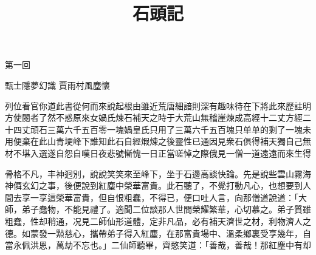 \documentclass[红楼梦甲戌本]{ltc-guji}
\title{石頭記}
\begin{document}
\begin{正文}
第一回

\begin{段落}[indent=2]
甄士隱夢幻識 賈雨村風塵懷
\end{段落}


列位看官你道此書從何而來說起根由雖近荒唐細諳則深有趣味待在下將此來歷註明方使閱者了然不惑原來女媧氏煉石補天之時于大荒山無稽崖煉成高經十二丈方經二十四丈頑石三萬六千五百零一塊媧皇氏只用了三萬六千五百塊只单单的剩了一塊未用便棄在此山青埂峰下誰知此石自經煆煉之後靈性已通因見衆石俱得補天獨自己無材不堪入選遂自怨自嘆日夜悲號慚愧一日正當嗟悼之際俄見一僧一道遠遠而來生得

骨格不凡，丰神迥別，說說笑笑來至峰下，坐于石邊高談快論。先是說些雲山霧海神僲玄幻之事，後便說到紅塵中榮華富貴。此石聽了，不覺打動凡心，也想要到人間去享一享這榮華富貴，但自恨粗蠢，不得已，便口吐人言，向那僧道說道：「大師，弟子蠢物，不能見禮了。適聞二位談那人世間榮耀繁華，心切慕之。弟子質雖粗蠢，性却稍通，况見二師仙形道體，定非凡品，必有補天濟世之材，利物濟人之德。如蒙發一㸃慈心，攜帶弟子得入紅塵，在那富貴場中、溫柔鄉裏受享幾年，自當永佩洪恩，萬劫不忘也。」二仙師聽畢，齊憨笑道：「善哉，善哉！那紅塵中有却

\end{正文}
\end{document}
